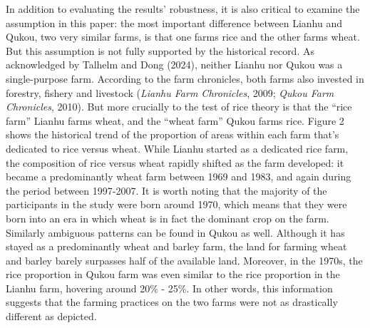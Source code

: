 \documentclass[
  man]{apa6}
\begin{document}
In addition to evaluating the results' robustness, it is also critical to examine the assumption in this paper: the most important difference between Lianhu and Qukou, two very similar farms, is that one farms rice and the other farms wheat. But this assumption is not fully supported by the historical record. As acknowledged by Talhelm and Dong (2024), neither Lianhu nor Qukou was a single-purpose farm. According to the farm chronicles, both farms also invested in forestry, fishery and livestock (\emph{Lianhu Farm Chronicles}, 2009; \emph{Qukou Farm Chronicles}, 2010). But more crucially to the test of rice theory is that the ``rice farm'' Lianhu farms wheat, and the ``wheat farm'' Qukou farms rice. Figure 2 shows the historical trend of the proportion of areas within each farm that's dedicated to rice versus wheat. While Lianhu started as a dedicated rice farm, the composition of rice versus wheat rapidly shifted as the farm developed: it became a predominantly wheat farm between 1969 and 1983, and again during the period between 1997-2007. It is worth noting that the majority of the participants in the study were born around 1970, which means that they were born into an era in which wheat is in fact the dominant crop on the farm. Similarly ambiguous patterns can be found in Qukou as well. Although it has stayed as a predominantly wheat and barley farm, the land for farming wheat and barley barely surpasses half of the available land. Moreover, in the 1970s, the rice proportion in Qukou farm was even similar to the rice proportion in the Lianhu farm, hovering around 20\% - 25\%. In other words, this information suggests that the farming practices on the two farms were not as drastically different as depicted.
\end{document}
